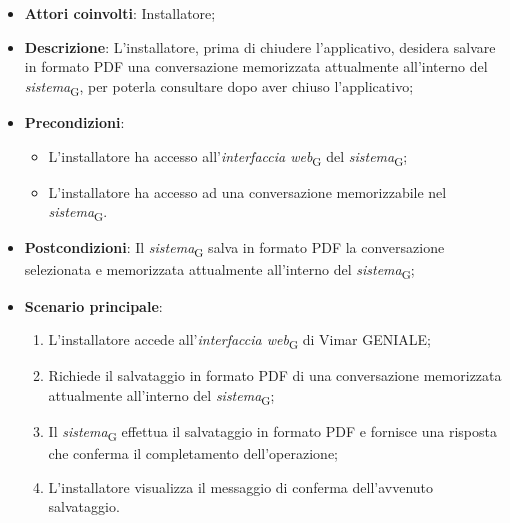 \begin{itemize}
    \item \textbf{Attori coinvolti}: Installatore;
    \item \textbf{Descrizione}: L’installatore, prima di chiudere l’applicativo, desidera salvare in formato PDF una conversazione memorizzata attualmente all’interno del \textit{sistema}\textsubscript{G}, per poterla consultare dopo aver chiuso l'applicativo;
    \item \textbf{Precondizioni}: 
    \begin{itemize}
        \item L’installatore ha accesso all’\textit{interfaccia web}\textsubscript{G} del \textit{sistema}\textsubscript{G};
        \item L’installatore ha accesso ad una conversazione memorizzabile nel \textit{sistema}\textsubscript{G}.
    \end{itemize}
    \item \textbf{Postcondizioni}: Il \textit{sistema}\textsubscript{G} salva in formato PDF la conversazione selezionata e memorizzata attualmente all’interno del \textit{sistema}\textsubscript{G};
    \item \textbf{Scenario principale}:
    \begin{enumerate}
        \item L’installatore accede all’\textit{interfaccia web}\textsubscript{G} di Vimar GENIALE;
        \item Richiede il salvataggio in formato PDF di una conversazione memorizzata attualmente all'interno del \textit{sistema}\textsubscript{G};
        \item Il \textit{sistema}\textsubscript{G} effettua il salvataggio in formato PDF e fornisce una risposta che conferma il completamento dell’operazione;
        \item L’installatore visualizza il messaggio di conferma dell’avvenuto salvataggio.
    \end{enumerate}
\end{itemize}


